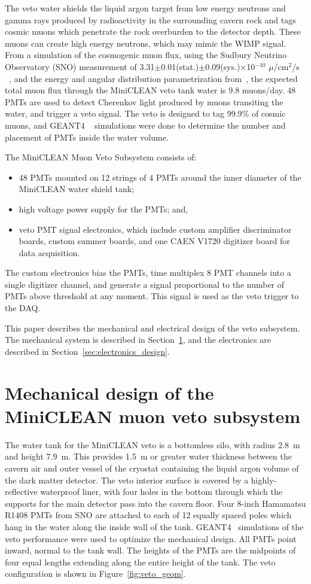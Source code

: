 \documentclass[review,number,sort&compress]{elsarticle}
\begin{document}
The veto water shields the liquid argon target from low energy neutrons and gamma
rays produced by radioactivity in the surrounding cavern rock and tags cosmic muons
which penetrate the rock overburden to the detector depth. These muons can
create high energy neutrons, which may mimic the WIMP signal.
From a simulation of the cosmogenic muon flux, using the Sudbury Neutrino Observatory (SNO) measurement of
3.31$\pm$0.01(stat.)$\pm$0.09(sys.)$\times$10$^{-10}$ $\mu$/cm$^2$/s
~\cite{ref:sno_muon_flux}, and the energy and angular distribution
parametrization from~\cite{ref:mei_and_hime}, the expected total muon flux
through the MiniCLEAN veto tank water is 9.8 muons/day. 48 PMTs are used to
detect Cherenkov light produced by muons transiting the water, and trigger a
veto signal. The veto is designed to tag 99.9\% of cosmic muons, and GEANT4
~\cite{ref:geant4} simulations were done to determine the number and placement
of PMTs inside the water volume. 

The MiniCLEAN Muon Veto Subsystem consists of:
\begin{itemize}
\item 48 PMTs mounted on 12 strings of 4 PMTs around the inner diameter of the MiniCLEAN water shield tank;
\item high voltage power supply for the PMTs; and,
\item veto PMT signal electronics, which include custom amplifier discriminator boards, custom summer boards, and one CAEN V1720 digitizer board for data acquisition. 
\end{itemize}
The custom electronics bias the PMTs, time multiplex 8 PMT channels into a
single digitizer channel, and generate a signal proportional to the number
of PMTs above threshold at any moment. This signal is used as the veto trigger to
the DAQ.

This paper describes the mechanical and electrical design of the veto
subsystem. The mechanical system is described in
Section~\ref{sec:subsystem_design}, and the electronics are
described in Section~\ref{sec:electronics_design}.


\section{Mechanical design of the MiniCLEAN muon veto subsystem}
\label{sec:subsystem_design}
%
The water tank for the MiniCLEAN veto is a bottomless silo, with
radius 2.8~m and height 7.9~m. This provides 1.5~m or greater
water thickness between the cavern air and outer vessel of the cryostat
containing the liquid argon volume of the dark matter detector. The veto
interior surface is covered by a highly-reflective waterproof liner,
with four holes in the bottom through which the supports for the main
detector pass into the cavern floor. Four 8-inch Hamamatsu R1408 PMTs
from SNO are attached to each of 12 equally spaced poles which hang in
the water along the inside wall of the tank. GEANT4~\cite{ref:geant4}
simulations of the veto performance were used to optimize the
mechanical design. All PMTs point inward, normal to the tank wall. The
heights of the PMTs are the midpoints of four equal lengths extending
along the entire height of the tank. The veto configuration is shown
in Figure~\ref{fig:veto_geom}.
\end{document}
